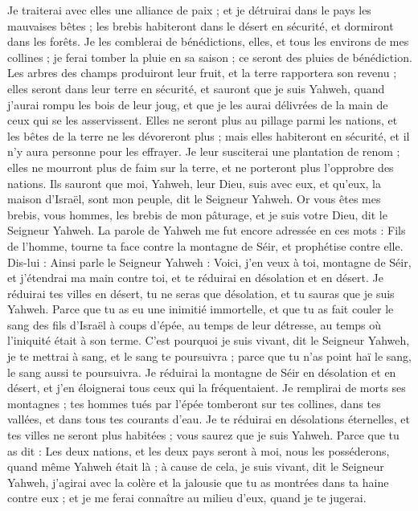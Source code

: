 \begin{multicols}{2}
Je traiterai avec elles une alliance de paix ; et je détruirai dans le pays les mauvaises bêtes ; les brebis habiteront dans le désert en sécurité, et dormiront dans les forêts.
Je les comblerai de bénédictions, elles, et tous les environs de mes collines ; je ferai tomber la pluie en sa saison ; ce seront des pluies de bénédiction.
Les arbres des champs produiront leur fruit, et la terre rapportera son revenu ; elles seront dans leur terre en sécurité, et sauront que je suis Yahweh, quand j'aurai rompu les bois de leur joug, et que je les aurai délivrées de la main de ceux qui se les asservissent.
Elles ne seront plus au pillage parmi les nations, et les bêtes de la terre ne les dévoreront plus ; mais elles habiteront en sécurité, et il n'y aura personne pour les effrayer.
Je leur susciterai une plantation de renom ; elles ne mourront plus de faim sur la terre, et ne porteront plus l'opprobre des nations.
Ils sauront que moi, Yahweh, leur Dieu, suis avec eux, et qu'eux, la maison d'Israël, sont mon peuple, dit le Seigneur Yahweh.
Or vous êtes mes brebis, vous hommes, les brebis de mon pâturage, et je suis votre Dieu, dit le Seigneur Yahweh.
\VerseOne{}La parole de Yahweh me fut encore adressée en ces mots :
Fils de l'homme, tourne ta face contre la montagne de Séir, et prophétise contre elle.
Dis-lui : Ainsi parle le Seigneur Yahweh : Voici, j'en veux à toi, montagne de Séir, et j'étendrai ma main contre toi, et te réduirai en désolation et en désert.
Je réduirai tes villes en désert, tu ne seras que désolation, et tu sauras que je suis Yahweh.
Parce que tu as eu une inimitié immortelle, et que tu as fait couler le sang des fils d'Israël à coups d'épée, au temps de leur détresse, au temps où l'iniquité était à son terme.
C'est pourquoi je suis vivant, dit le Seigneur Yahweh, je te mettrai à sang, et le sang te poursuivra ; parce que tu n'as point haï le sang, le sang aussi te poursuivra.
Je réduirai la montagne de Séir en désolation et en désert, et j'en éloignerai tous ceux qui la fréquentaient.
Je remplirai de morts ses montagnes ; tes hommes tués par l'épée tomberont sur tes collines, dans tes vallées, et dans tous tes courants d'eau.
Je te réduirai en désolations éternelles, et tes villes ne seront plus habitées ; vous saurez que je suis Yahweh.
Parce que tu as dit : Les deux nations, et les deux pays seront à moi, nous les posséderons, quand même Yahweh était là ;
à cause de cela, je suis vivant, dit le Seigneur Yahweh, j'agirai avec la colère et la jalousie que tu as montrées dans ta haine contre eux ; et je me ferai connaître au milieu d'eux, quand je te jugerai.

\end{multicols}
